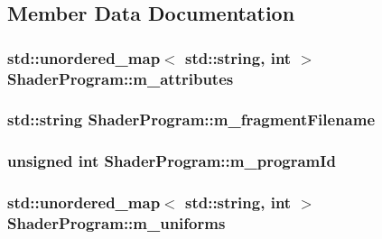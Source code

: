 \subsection{Member Data Documentation}
\hypertarget{classShaderProgram_a0386f31b01d73becea688fb534298336}{
\subsubsection[{m\+\_\+attributes}]{\setlength{\rightskip}{0pt plus 5cm}std\+::unordered\+\_\+map$<$ std\+::string, int $>$ Shader\+Program\+::m\+\_\+attributes\hspace{0.3cm}{\ttfamily [private]}}}\label{classShaderProgram_a0386f31b01d73becea688fb534298336}
\hypertarget{classShaderProgram_aad0272796704f94875ef0d09db3d4c82}{
\subsubsection[{m\+\_\+fragment\+Filename}]{\setlength{\rightskip}{0pt plus 5cm}std\+::string Shader\+Program\+::m\+\_\+fragment\+Filename\hspace{0.3cm}{\ttfamily [private]}}}\label{classShaderProgram_aad0272796704f94875ef0d09db3d4c82}
\hypertarget{classShaderProgram_a131f977e3396fd633f2c58e9919590a4}{
\subsubsection[{m\+\_\+program\+Id}]{\setlength{\rightskip}{0pt plus 5cm}unsigned int Shader\+Program\+::m\+\_\+program\+Id\hspace{0.3cm}{\ttfamily [private]}}}\label{classShaderProgram_a131f977e3396fd633f2c58e9919590a4}
\hypertarget{classShaderProgram_a97e3260f6a74a23c0ce43e2b2f535d69}{
\subsubsection[{m\+\_\+uniforms}]{\setlength{\rightskip}{0pt plus 5cm}std\+::unordered\+\_\+map$<$ std\+::string, int $>$ Shader\+Program\+::m\+\_\+uniforms\hspace{0.3cm}{\ttfamily [private]}}}\label{classShaderProgram_a97e3260f6a74a23c0ce43e2b2f535d69}
